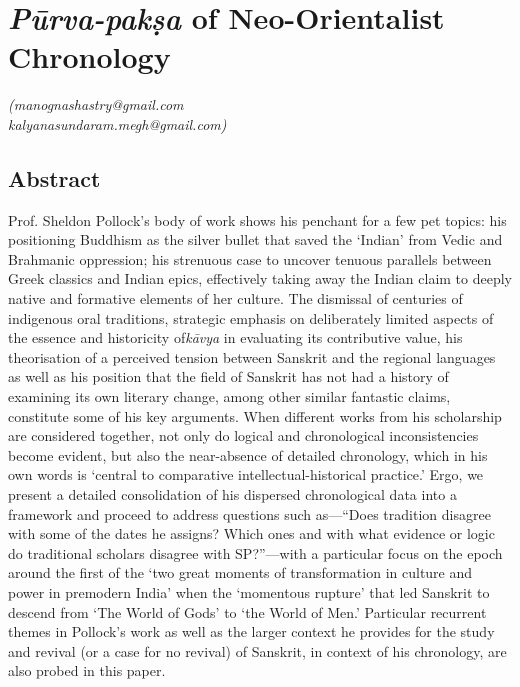 
\chapter{\textit{Pūrva-pakṣa} of Neo-Orientalist Chronology}\label{chapter1}




\begin{flushright}
\textit{(manognashastry@gmail.com}\\\textit{kalyanasundaram.megh@gmail.com)}
\end{flushright}


\section*{Abstract}

Prof. Sheldon Pollock’s body of work shows his penchant for a few pet topics: his positioning Buddhism as the silver bullet that saved the ‘Indian’ from Vedic and Brahmanic oppression; his strenuous case to uncover tenuous parallels between Greek classics and Indian epics, effectively taking away the Indian claim to deeply native and formative elements of her culture. The dismissal of centuries of indigenous oral traditions, strategic emphasis on deliberately limited aspects of the essence and historicity of\textit{kāvya} in evaluating its contributive value, his theorisation of a perceived tension between Sanskrit and the regional languages as well as his position that the field of Sanskrit has not had a history of examining its own literary change, among other similar fantastic claims, constitute some of his key arguments. When different works from his scholarship are considered together, not only do logical and chronological inconsistencies become evident, but also the near-absence of detailed chronology, which in his own words is ‘central to comparative intellectual-historical practice.’ Ergo, we present a detailed consolidation of his dispersed chronological data into a framework and proceed to address questions such as—“Does tradition disagree with some of the dates he assigns? Which ones and with what evidence or logic do traditional scholars disagree with SP?”—with a particular focus on the epoch around the first of the ‘two great moments of transformation in culture and power in premodern India’ when the ‘momentous rupture’ that led Sanskrit to descend from ‘The World of Gods’ to ‘the World of Men.’ Particular recurrent themes in Pollock’s work as well as the larger context he provides for the study and revival (or a case for no revival) of Sanskrit, in context of his chronology, are also probed in this paper.


